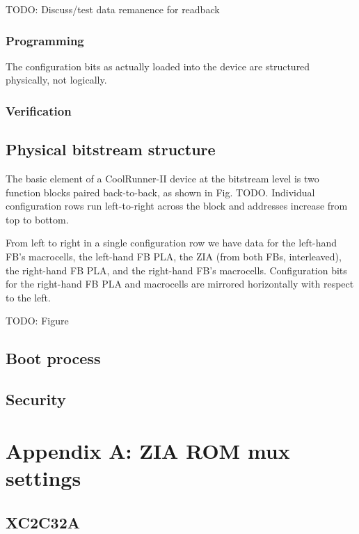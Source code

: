 \documentclass[pdftex,letterpaper]{article}
\begin{document}
TODO: Discuss/test data remanence for readback

\subsubsection{Programming}

The configuration bits as actually loaded into the device are structured physically, not logically. 

\subsubsection{Verification}

\subsection{Physical bitstream structure}

The basic element of a CoolRunner-II device at the bitstream level is two function blocks paired back-to-back, 
as shown in Fig. TODO. Individual configuration rows run left-to-right across the block and addresses increase 
from top to bottom.

From left to right in a single configuration row we have data for the left-hand FB's macrocells, the left-hand 
FB PLA, the ZIA (from both FBs, interleaved), the right-hand FB PLA, and the right-hand FB's macrocells. 
Configuration bits for the right-hand FB PLA and macrocells are mirrored horizontally with respect to the left.

TODO: Figure

\subsection{Boot process}

\subsection{Security}

\pagebreak
\section{Appendix A: ZIA ROM mux settings}

\subsection{XC2C32A}
\end{document}
